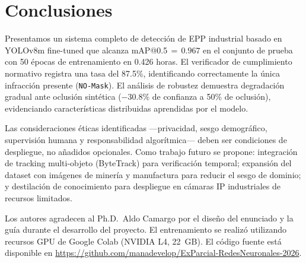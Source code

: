 \documentclass{article}
\begin{document}
\section{Conclusiones}
\label{sec:conclusions}

Presentamos un sistema completo de detección de EPP industrial basado
en YOLOv8m fine-tuned que alcanza mAP@0.5\,$=\,0.967$ en el conjunto
de prueba con 50 épocas de entrenamiento en 0.426 horas. El verificador
de cumplimiento normativo registra una tasa del 87.5\%, identificando
correctamente la única infracción presente (\texttt{NO-Mask}).
El análisis de robustez demuestra degradación gradual ante oclusión
sintética ($-30.8\%$ de confianza a 50\% de oclusión), evidenciando
características distribuidas aprendidas por el modelo.

Las consideraciones éticas identificadas —privacidad, sesgo demográfico,
supervisión humana y responsabilidad algorítmica— deben ser condiciones
de despliegue, no añadidos opcionales. Como trabajo futuro se propone:
integración de tracking multi-objeto (ByteTrack) para verificación
temporal; expansión del dataset con imágenes de minería y manufactura
para reducir el sesgo de dominio; y destilación de conocimiento para
despliegue en cámaras IP industriales de recursos limitados.

\begin{ack}
Los autores agradecen al Ph.D.\ Aldo Camargo por el diseño del
enunciado y la guía durante el desarrollo del proyecto. El entrenamiento
se realizó utilizando recursos GPU de Google Colab (NVIDIA L4, 22~GB).
El código fuente está disponible en
\url{https://github.com/manadevelop/ExParcial-RedesNeuronales-2026}.
\end{ack}

\end{document}
